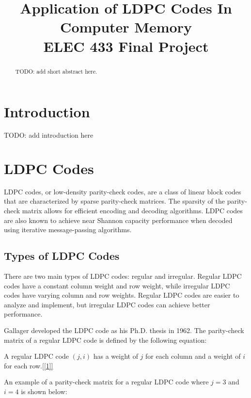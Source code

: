 \documentclass[conference]{IEEEtran}
\begin{document}
\title{Application of LDPC Codes In Computer Memory\\
{\large ELEC 433 Final Project}
}

\author{
  \and
}

\maketitle

\begin{abstract}
  TODO: add short abstract here.
\end{abstract}

\section{Introduction}
TODO: add introduction here

\section{LDPC Codes}
LDPC codes, or low-density parity-check codes, are a class of linear block
codes that are characterized by sparse parity-check matrices. The sparsity of
the parity-check matrix allows for efficient encoding and decoding algorithms.
LDPC codes are also known to achieve near Shannon capacity performance when
decoded using iterative message-passing algorithms.

\subsection{Types of LDPC Codes}
There are two main types of LDPC codes: regular and irregular. Regular LDPC
codes have a constant column weight and row weight, while irregular LDPC codes
have varying column and row weights. Regular LDPC codes are easier to analyze
and implement, but irregular LDPC codes can achieve better performance.

Gallager developed the LDPC code as his Ph.D. thesis in 1962. The parity-check
matrix of a regular LDPC code is defined by the following equation:

A regular LDPC code $(j,i)$ has a weight of $j$ for each column and a weight of
$i$ for each row.\ref{[1]}

An example of a parity-check matrix for a regular LDPC code where $j=3$ and
$i=4$ is shown below:
\end{document}
